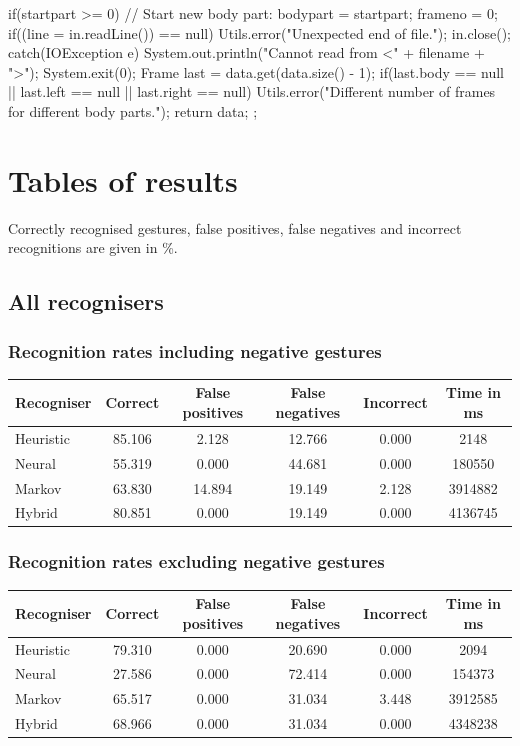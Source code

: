 \documentclass[12pt,a4,notitlepage]{report}
\renewcommand{\_}{\texttt{\symbol{95}}}
\newcommand{\<}{\texttt{\symbol{60}}}
\renewcommand{\>}{\texttt{\symbol{62}}}
\begin{document}
\begin{code}
{{{{            if(startpart >= 0)
            {
               // Start new body part:
               bodypart = startpart;
               frameno = 0;
               if((line = in.readLine()) == null)
                  Utils.error("Unexpected end of file.");
            }
         }
         in.close();
      }
      catch(IOException e)
      {
         System.out.println("Cannot read from <" + filename + ">");
         System.exit(0);
      }
      Frame last = data.get(data.size() - 1);
      if(last.body == null || last.left == null || last.right == null)
         Utils.error("Different number of frames for different body parts.");
      return data;
   }
};


\end{code}

\chapter{Tables of results}

Correctly recognised gestures, false positives, false negatives and
incorrect recognitions are given in \%.

\section{All recognisers}

\subsection{Recognition rates including negative gestures}

\begin{tabular}{l|ccccc}
Recogniser & Correct & False positives & False negatives & Incorrect & Time in ms \\ \hline
Heuristic & 85.106 & 2.128 & 12.766 & 0.000 & 2148 \\
Neural & 55.319 & 0.000 & 44.681 & 0.000 & 180550 \\
Markov & 63.830 & 14.894 & 19.149 & 2.128 & 3914882	\\
Hybrid & 80.851 & 0.000 & 19.149 & 0.000 & 4136745 \\
\end{tabular}	

\subsection{Recognition rates excluding negative gestures}

\begin{tabular}{l|ccccc}
Recogniser & Correct & False positives & False negatives & Incorrect & Time in ms \\ \hline
Heuristic & 79.310 & 0.000 & 20.690 & 0.000 & 2094	\\
Neural & 27.586 & 0.000 & 72.414 & 0.000 & 154373	\\
Markov & 65.517 & 0.000 & 31.034 & 3.448 & 3912585	\\
Hybrid & 68.966 & 0.000 & 31.034 & 0.000 & 4348238	\\
\end{tabular}	
\end{document}

